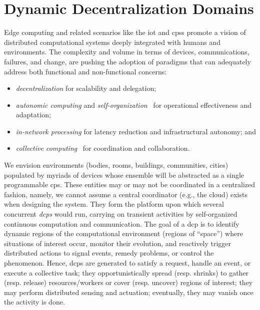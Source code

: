 \chapter{Dynamic Decentralization Domains} %
Edge computing
 and related scenarios
 like the \ac{iot} and \acp{cps}
 promote a vision of
 distributed computational systems 
 deeply integrated with
 humans and environments.
% 
%
The complexity and volume in terms of devices, communications, failures, and change,
 are pushing the adoption of paradigms 
 that can %
 adequately address both functional
 and non-functional concerns:
\begin{itemize}
  \item \emph{decentralization} for scalability and delegation;
  \item \emph{autonomic computing} and \emph{self-organization}~\cite{DBLP:journals/computer/KephartC03} for operational effectiveness and adaptation;
  \item \emph{in-network processing} for latency reduction and infrastructural autonomy; and
  \item \emph{collective computing}~\cite{DBLP:journals/eaai/CasadeiVAPD21} for coordination and collaboration.
\end{itemize}

We envision environments (bodies, rooms, buildings, communities, cities)
 populated by myriads of devices
 whose ensemble will be abstracted as a single programmable \ac{cps}.
%
These entities may or may not be coordinated in a centralized fashion,
namely,
we cannot assume a central coordinator (e.g., the cloud) exists when designing the system.
%
They form the platform %
 upon which several concurrent
 \emph{\acp{dcp}} 
 would run, carrying on transient activities
 by self-organized continuous computation and communication. %
%
The goal of a \ac{dcp} is to identify dynamic regions of the computational environment (regions of ``space'') where
situations of interest occur,
monitor their evolution,
and reactively trigger distributed actions to signal events,
remedy problems,
or control the phenomenon.
%
Hence, \acp{dcp}
 are generated
 to satisfy a request,
 handle an event, or 
 execute a collective task;
 they opportunistically spread (resp. shrinks)
 to gather (resp. release) resources/workers
 or cover (resp. uncover) regions of interest;
 they may perform 
 distributed sensing and actuation;
eventually, they may vanish once the activity is done.
 
